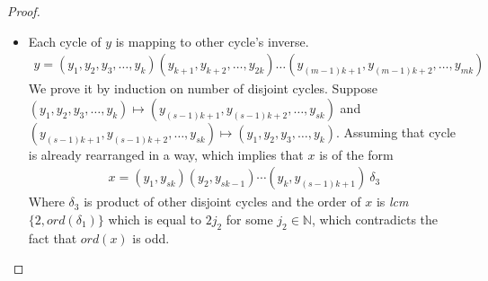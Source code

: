 \documentclass[10pt,a4paper]{amsart}
\newcommand{\lcm}{lcm}
\newcommand{\ord}{ord}
\begin{document}
\begin{proof}
\begin{itemize}
\begin{itemize}
\begin{align*}
                        \ord(x) &= \lcm\{2, \ord(\delta_1)\} \text{ or } lcm\{2, \ord(\delta_2)\}\\
                        &= 2j_1 \text{ for some $j_1 \in \mathbb{N}$}
                    \end{align*}
                    which contradicts the fact that $\ord(x)$ is odd.
                    \item[Case (2).] Each cycle of $y$ is mapping to other cycle's inverse.
                    \begin{align*}
                        y = (y_1, y_2, y_3, \ldots, y_k)(y_{k + 1}, y_{k + 2}, \ldots, y_{2k}) \ldots (y_{(m - 1)k + 1}, y_{(m - 1)k + 2}, \ldots, y_{mk})
                    \end{align*}
                    We prove it by induction on number of disjoint cycles. Suppose $(y_1, y_2, y_3, \ldots , y_k) \mapsto (y_{(s- 1)k + 1}, y_{(s- 1)k + 2}, \ldots , y_{sk})$ and $(y_{(s- 1)k + 1}, y_{(s- 1)k + 2}, \ldots , y_{sk}) \mapsto (y_1, y_2, y_3, \ldots , y_k)$. Assuming that cycle is already rearranged in a way, which implies that $x$ is of the form
                    \begin{align*}
                        x = (y_1, y_{sk})(y_2, y_{sk - 1}) \cdots (y_k, y_{(s - 1)k + 1})\ \delta_3
                    \end{align*}
                    Where $\delta_3$ is product of other disjoint cycles and the order of $x$ is \textit{lcm}$\{2, \ord(\delta_1)\}$  which is equal to $2j_2$ for some $j_2 \in \mathbb{N}$, which contradicts the fact that $\ord(x)$ is odd.
    

\end{itemize}
\end{itemize}
\end{proof}
\end{document}
